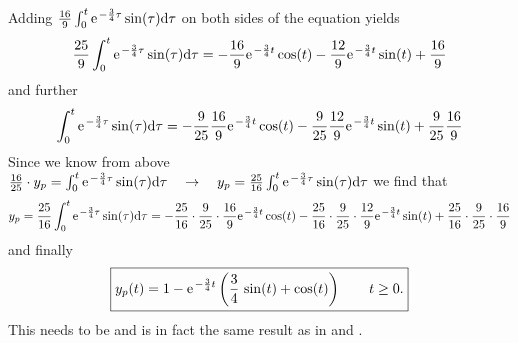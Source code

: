 \documentclass[11pt,a4paper,DIV=12]{scrartcl}
\begin{document}
%
Adding $\frac{16}{9} \int_0^t\e^{-\frac{3}{4}\tau} \sin(\tau) \mathrm{d}\tau$ on both
sides of the equation yields
%
\begin{align}
	\frac{25}{9}\int_0^t\e^{-\frac{3}{4}\tau}\sin(\tau)\mathrm{d}\tau=-\frac{16}{9}\e^{-\frac{3}{4}t}\cos(t)-\frac{12}{9}\e^{-\frac{3}{4}t}\sin(t)+\frac{16}{9} \nonumber
\end{align}
and further
\begin{align}
	\int_0^t\e^{-\frac{3}{4}\tau}\sin(\tau)\mathrm{d}\tau=-\frac{9}{25}\frac{16}{9}\e^{-\frac{3}{4}t}\cos(t)-\frac{9}{25}\frac{12}{9}\e^{-\frac{3}{4}t}\sin(t)+\frac{9}{25}\frac{16}{9} \nonumber
\end{align}
%
Since we know from above
$\frac{16}{25}\cdot y_p = \int_0^t\e^{-\frac{3}{4}\tau} \sin(\tau)\mathrm{d}\tau
\quad\rightarrow\quad
y_p = \frac{25}{16} \int_0^t\e^{-\frac{3}{4}\tau} \sin(\tau)\mathrm{d}\tau$
we find that
\begin{align}
	y_p = \frac{25}{16} \int_0^t\e^{-\frac{3}{4}\tau}\sin(\tau)\mathrm{d}\tau
	=-\frac{25}{16}\cdot\frac{9}{25}\cdot\frac{16}{9}\e^{-\frac{3}{4}t}\cos(t)-\frac{25}{16}\cdot\frac{9}{25}\cdot\frac{12}{9}\e^{-\frac{3}{4}t}\sin(t)+\frac{25}{16}\cdot\frac{9}{25}\cdot\frac{16}{9} \nonumber
\end{align}
and finally
\begin{align}
\boxed{
	y_p(t)=1-\e^{-\frac{3}{4}t}\left(\frac{3}{4}\,\sin(t)+\cos(t)\right) \qquad t \geq 0.}
\end{align}
%
This needs to be and is in fact the same result as in  and .
\end{document}
